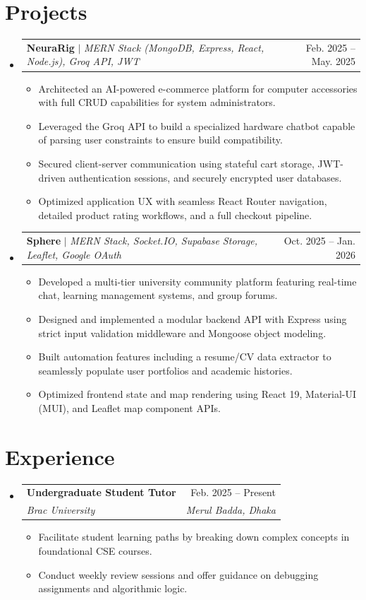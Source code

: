 \documentclass[letterpaper,10pt]{article}
\makeatletter
\newcommand{\resumeItem}[1]{
  \item\small{
    {#1 \vspace{-2pt}}
  }
}
\newcommand{\resumeSubheading}[4]{
  \vspace{-2pt}\item
    \begin{tabular*}{0.97\textwidth}[t]{l@{\extracolsep{\fill}}r}
      \textbf{#1} & #2 \\
      \textit{\small#3} & \textit{\small #4} \\
    \end{tabular*}\vspace{-7pt}
}
\newcommand{\resumeProjectHeading}[2]{
    \item
    \begin{tabular*}{0.97\textwidth}{l@{\extracolsep{\fill}}r}
      \small#1 & #2 \\
    \end{tabular*}\vspace{-7pt}
}
\newcommand{\resumeSubHeadingListStart}{\begin{itemize}[leftmargin=0.15in, label={}]}
\newcommand{\resumeSubHeadingListEnd}{\end{itemize}}
\newcommand{\resumeItemListStart}{\begin{itemize}}
\newcommand{\resumeItemListEnd}{\end{itemize}\vspace{-5pt}}
\makeatother
\begin{document}
\section{Projects}
    \resumeSubHeadingListStart          
      \resumeProjectHeading
    {\textbf{NeuraRig} $|$ \emph{MERN Stack (MongoDB, Express, React, Node.js), Groq API, JWT}}{Feb. 2025 -- May. 2025}
    \resumeItemListStart
      \resumeItem{Architected an AI-powered e-commerce platform for computer accessories with full CRUD capabilities for system administrators.}
      \resumeItem{Leveraged the Groq API to build a specialized hardware chatbot capable of parsing user constraints to ensure build compatibility.}
      \resumeItem{Secured client-server communication using stateful cart storage, JWT-driven authentication sessions, and securely encrypted user databases.}
      \resumeItem{Optimized application UX with seamless React Router navigation, detailed product rating workflows, and a full checkout pipeline.}
    \resumeItemListEnd

    \resumeProjectHeading
    {\textbf{Sphere} $|$ \emph{MERN Stack, Socket.IO, Supabase Storage, Leaflet, Google OAuth}}{Oct. 2025 -- Jan. 2026}
    \resumeItemListStart
      \resumeItem{Developed a multi-tier university community platform featuring real-time chat, learning management systems, and group forums.}
      \resumeItem{Designed and implemented a modular backend API with Express using strict input validation middleware and Mongoose object modeling.}
      \resumeItem{Built automation features including a resume/CV data extractor to seamlessly populate user portfolios and academic histories.}
      \resumeItem{Optimized frontend state and map rendering using React 19, Material-UI (MUI), and Leaflet map component APIs.}
    \resumeItemListEnd
    \resumeSubHeadingListEnd


\section{Experience}
  \resumeSubHeadingListStart
    \resumeSubheading
      {Undergraduate Student Tutor}{Feb. 2025 -- Present}
      {Brac University}{Merul Badda, Dhaka}
      \resumeItemListStart
        \resumeItem{Facilitate student learning paths by breaking down complex concepts in foundational CSE courses.}
        \resumeItem{Conduct weekly review sessions and offer guidance on debugging assignments and algorithmic logic.}
      \resumeItemListEnd
  \resumeSubHeadingListEnd
\end{document}
